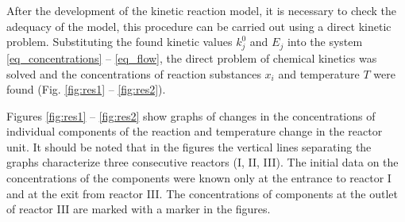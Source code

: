 \documentclass[mathematics,article,submit,pdftex,moreauthors]{Definitions/mdpi}
\begin{document}
After the development of the kinetic reaction model, it is necessary to check the adequacy of the model, this procedure can be carried out using a direct kinetic problem. Substituting the found kinetic values $k_j^0$ and $E_j$ into the system \eqref{eq_concentrations} -- \eqref{eq_flow}, the direct problem of chemical kinetics was solved and the concentrations of reaction substances $x_i$ and temperature $T$ were found (Fig. \ref{fig:res1} -- \ref{fig:res2}).

Figures \ref{fig:res1} -- \ref{fig:res2} show graphs of changes in the concentrations of individual components of the reaction and temperature change in the reactor unit. It should be noted that in the figures the vertical lines separating the graphs characterize three consecutive reactors (I, II, III).  The initial data on the concentrations of the components were known only at the entrance to reactor I and at the exit from reactor III. The concentrations of components at the outlet of reactor III are marked with a marker in the figures.
\end{document}
